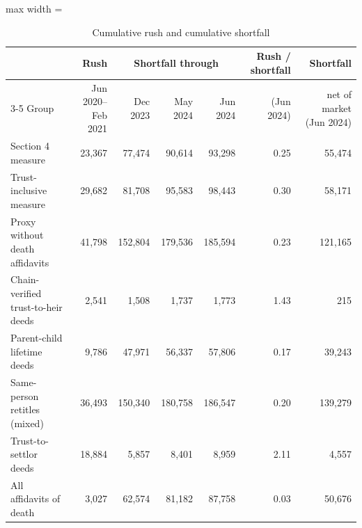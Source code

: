 \begin{table}[!ht]\centering
\caption{Cumulative rush and cumulative shortfall}
\label{tab:s4hole}
{\small
\begin{adjustbox}{max width = \textwidth}
\begin{tabular}{lrrrrrr}
\toprule
 & Rush & \multicolumn{3}{c}{Shortfall through} & Rush / shortfall & Shortfall \\
\cmidrule(lr){3-5}
Group & Jun 2020--Feb 2021 & Dec 2023 & May 2024 & Jun 2024 & (Jun 2024) & net of market (Jun 2024) \\
\midrule
Section 4 measure & 23,367 & 77,474 & 90,614 & 93,298 & 0.25 & 55,474 \\
Trust-inclusive measure & 29,682 & 81,708 & 95,583 & 98,443 & 0.30 & 58,171 \\
Proxy without death affidavits & 41,798 & 152,804 & 179,536 & 185,594 & 0.23 & 121,165 \\
Chain-verified trust-to-heir deeds & 2,541 & 1,508 & 1,737 & 1,773 & 1.43 & 215 \\
Parent-child lifetime deeds & 9,786 & 47,971 & 56,337 & 57,806 & 0.17 & 39,243 \\
Same-person retitles (mixed) & 36,493 & 150,340 & 180,758 & 186,547 & 0.20 & 139,279 \\
Trust-to-settlor deeds & 18,884 & 5,857 & 8,401 & 8,959 & 2.11 & 4,557 \\
All affidavits of death & 3,027 & 62,574 & 81,182 & 87,758 & 0.03 & 50,676 \\
\bottomrule
\end{tabular}
\end{adjustbox}}
\begin{minipage}{0.95\textwidth}\end{minipage}
\end{table}
